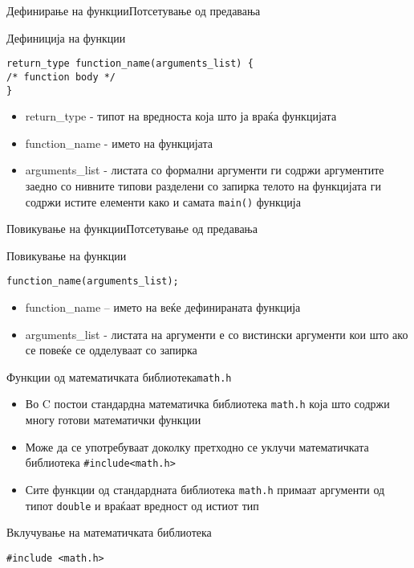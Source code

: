 


\begin{frame}[fragile]{Дефинирање на функции}{Потсетување од предавања}
\begin{block}{Дефиниција на функции}
\begin{lstlisting}
return_type function_name(arguments_list) {
/* function body */
}
\end{lstlisting}
\end{block}
\begin{itemize}
    \item return\_type - типот на вредноста која што ја враќа функцијата
    \item function\_name - името на функцијата
    \item arguments\_list - листата со формални аргументи ги содржи аргументите
    заедно со нивните типови разделени со запирка телото на функцијата ги содржи истите елементи како и самата \texttt{main()} функција    
\end{itemize}
\end{frame}

\begin{frame}[fragile]{Повикување на функции}{Потсетување од предавања}
\begin{block}{Повикување на функции}
\begin{lstlisting}
function_name(arguments_list);
\end{lstlisting}
\end{block}
\begin{itemize}
    \item function\_name – името на веќе дефинираната  функција
    \item arguments\_list - листата на аргументи е со вистински аргументи кои
    што ако се повеќе се одделуваат со запирка
\end{itemize}
\end{frame}

\begin{frame}[fragile]{Функции од математичката библиотека}{\texttt{math.h}}
\begin{itemize}
    \item Во C постои стандардна математичка библиотека \texttt{math.h} која што содржи многу готови математички функции
    \item Може да се употребуваат доколку претходно се уклучи математичката
    библиотека \texttt{\#include<math.h>}
    \item Сите функции од стандардната библиотека \texttt{math.h} примаат аргументи од
    типот \texttt{double} и враќаат вредност од истиот тип
\end{itemize}
\begin{block}{Вклучување на математичката библиотека}
\begin{lstlisting}
#include <math.h>
\end{lstlisting}
\end{block}
\end{frame}

